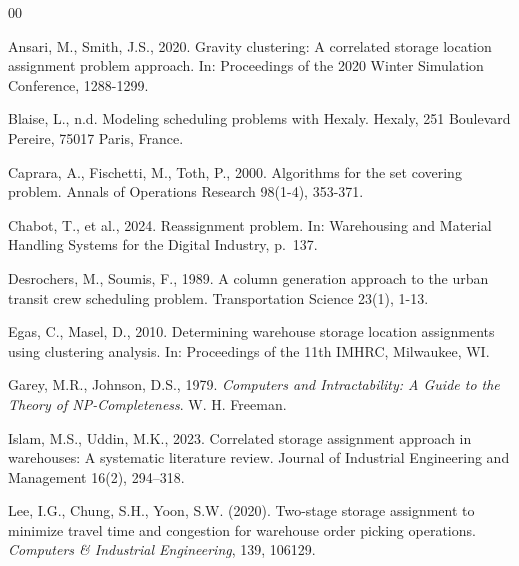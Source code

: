 \documentclass[11pt]{elsarticle}
\begin{document}
\begin{thebibliography}{00}

Ansari, M., Smith, J.S., 2020. Gravity clustering: A correlated storage location assignment problem approach. In: Proceedings of the 2020 Winter Simulation Conference, 1288-1299.


Blaise, L., n.d. Modeling scheduling problems with Hexaly. Hexaly, 251 Boulevard Pereire, 75017 Paris, France.

Caprara, A., Fischetti, M., Toth, P., 2000. Algorithms for the set covering problem. Annals of Operations Research 98(1-4), 353-371.

Chabot, T., et al., 2024. Reassignment problem. In: Warehousing and Material Handling Systems for the Digital Industry, p.~137.

Desrochers, M., Soumis, F., 1989. A column generation approach to the urban transit crew scheduling problem. Transportation Science 23(1), 1-13.

Egas, C., Masel, D., 2010. Determining warehouse storage location assignments using clustering analysis. In: Proceedings of the 11th IMHRC, Milwaukee, WI.

Garey, M.R., Johnson, D.S., 1979. \textit{Computers and Intractability: A Guide to the Theory of NP-Completeness}. W. H. Freeman.

Islam, M.S., Uddin, M.K., 2023. Correlated storage assignment approach in warehouses: A systematic literature review. Journal of Industrial Engineering and Management 16(2), 294--318.

Lee, I.G., Chung, S.H., Yoon, S.W. (2020).
Two-stage storage assignment to minimize travel time and congestion for warehouse order picking operations.
\textit{Computers \& Industrial Engineering}, 139, 106129.


\end{thebibliography}
\end{document}
